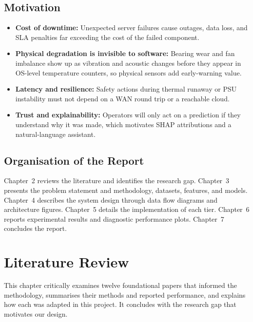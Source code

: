 \documentclass[12pt,a4paper]{report}
\begin{document}
\section{Motivation}
\begin{itemize}
  \item \textbf{Cost of downtime:} Unexpected server failures cause outages, data loss, and SLA penalties far exceeding the cost of the failed component.
  \item \textbf{Physical degradation is invisible to software:} Bearing wear and fan imbalance show up as vibration and acoustic changes before they appear in OS-level temperature counters, so physical sensors add early-warning value.
  \item \textbf{Latency and resilience:} Safety actions during thermal runaway or PSU instability must not depend on a WAN round trip or a reachable cloud.
  \item \textbf{Trust and explainability:} Operators will only act on a prediction if they understand why it was made, which motivates SHAP attributions and a natural-language assistant.
\end{itemize}

\section{Organisation of the Report}
Chapter~2 reviews the literature and identifies the research gap. Chapter~3 presents the problem statement and methodology, datasets, features, and models. Chapter~4 describes the system design through data flow diagrams and architecture figures. Chapter~5 details the implementation of each tier. Chapter~6 reports experimental results and diagnostic performance plots. Chapter~7 concludes the report.

\clearpage

\chapter{Literature Review}

This chapter critically examines twelve foundational papers that informed the methodology, summarises their methods and reported performance, and explains how each was adapted in this project. It concludes with the research gap that motivates our design.
\end{document}
